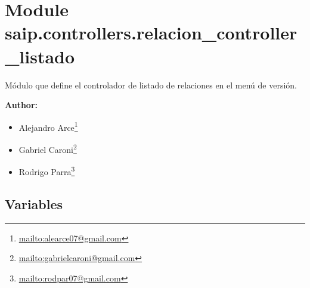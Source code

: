 %
%
%


\section{Module saip.controllers.relacion\_controller\_listado}

    \label{saip:controllers:relacion_controller_listado}
Módulo que define el controlador de listado de relaciones en el menú de 
versión.

\textbf{Author:} \begin{itemize}
\setlength{\parskip}{0.6ex}
  \item Alejandro 
    Arce\footnote{\href{mailto:alearce07@gmail.com}{mailto:alearce07@gmail.com}}

  \item Gabriel 
    Caroni\footnote{\href{mailto:gabrielcaroni@gmail.com}{mailto:gabrielcaroni@gmail.com}}

  \item Rodrigo 
    Parra\footnote{\href{mailto:rodpar07@gmail.com}{mailto:rodpar07@gmail.com}}

\end{itemize}





  \subsection{Variables}

